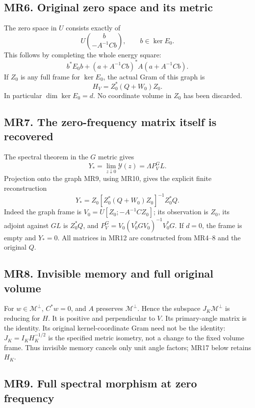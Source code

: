 \documentclass[11pt]{article}
\begin{document}
\subsection{MR6. Original zero space and its metric}\label{mr6.-original-zero-space-and-its-metric}

The zero space in \(U\) consists exactly of \[
 U\binom{b}{-A^{-1}Cb},\qquad b\in\ker E_0.
\tag{MR9}
\] This follows by completing the whole energy square: \[
 b^*E_0b+(a+A^{-1}Cb)^*A(a+A^{-1}Cb).
\] If \(Z_0\) is any full frame for \(\ker E_0\), the actual Gram of this graph is \[
 H_V=Z_0^*(Q+W_0)Z_0 .
\tag{MR10}
\] In particular \(\dim\ker E_0=d\). No coordinate volume in \(Z_0\) has been discarded.

\subsection{MR7. The zero-frequency matrix itself is recovered}\label{mr7.-the-zero-frequency-matrix-itself-is-recovered}

The spectral theorem in the \(G\) metric gives \[
 Y_*=\lim_{z\downarrow0}\mathscr Y(z)=\Lambda P_V^G L .
\tag{MR11}
\] Projection onto the graph MR9, using MR10, gives the explicit finite reconstruction \[
 \boxed{Y_*=Z_0[Z_0^*(Q+W_0)Z_0]^{-1}Z_0^*Q.}
\tag{MR12}
\] Indeed the graph frame is \(V_0=U[Z_0;-A^{-1}CZ_0]\); its observation is \(Z_0\), its adjoint against \(GL\) is \(Z_0^*Q\), and \(P_V^G=V_0(V_0^*GV_0)^{-1}V_0^*G\). If \(d=0\), the frame is empty and \(Y_*=0\). All matrices in MR12 are constructed from MR4--8 and the original \(Q\).

\subsection{MR8. Invisible memory and full original volume}\label{mr8.-invisible-memory-and-full-original-volume}

For \(w\in\mathcal M^\perp\), \(C^*w=0\), and \(A\) preserves \(\mathcal M^\perp\). Hence the subspace \(J_K\mathcal M^\perp\) is reducing for \(H\). It is positive and perpendicular to \(V\). Its primary-angle matrix is the identity. Its original kernel-coordinate Gram need not be the identity: \(J_K=I_KH_K^{-1/2}\) is the specified metric isometry, not a change to the fixed volume frame. Thus invisible memory cancels only unit angle factors; MR17 below retains \(H_K\).

\subsection{MR9. Full spectral morphism at zero frequency}\label{mr9.-full-spectral-morphism-at-zero-frequency}
\end{document}
